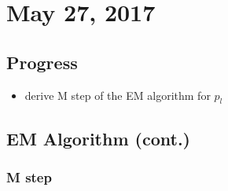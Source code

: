 \documentclass{article}
\begin{document}
\section{May 27, 2017}
\subsection{Progress}
\begin{itemize}
  \item derive M step of the EM algorithm for $p_l$
\end{itemize}

\subsection{EM Algorithm (cont.)}

\subsubsection{M step}
\end{document}
